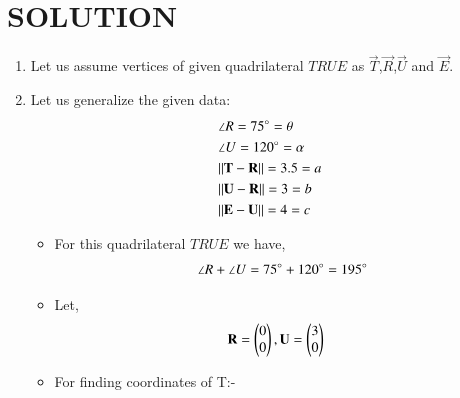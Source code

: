 \documentclass[journal,12pt,twocolumn]{IEEEtran}
\begin{document}
\section{SOLUTION}
\begin{enumerate}
\item Let us assume vertices of given quadrilateral $TRUE$ as $\vec{T}$,$\vec{R}$,$\vec{U}$ and $\vec{E}$.
\item Let us generalize the given data:
    \begin{align}
    &\angle R= 75\degree=\theta \label{eq1}
    \\
    &\angle U= 120\degree=\alpha \label{eq2}
    \\
    &\Vert\mathbf{T}-\mathbf{R}\rVert =3.5=a \label{eq3}
    \\
    &\Vert\mathbf{U}-\mathbf{R}\rVert =3=b \label{eq4}
    \\
     &\Vert\mathbf{E}-\mathbf{U}\rVert =4=c \label{eq5}
    \end{align}
\begin{itemize}
\item For this quadrilateral $TRUE$ we have,
\begin{align}
\angle R +\angle U = 75\degree + 120\degree =195\degree
\end{align}
\item Let, \begin{align}
    &\mathbf{R}=\begin{pmatrix}0\\0\end{pmatrix}, \mathbf{U}=\begin{pmatrix}3\\0\end{pmatrix}
\end{align}
\end{itemize}
\begin{itemize}
\item For finding coordinates of T:-

\end{itemize}
\end{enumerate}
\end{document}
